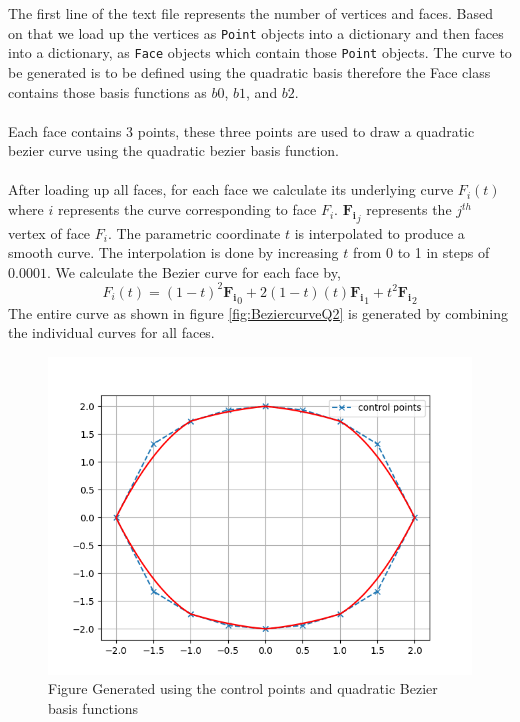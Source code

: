 \documentclass[a4paper, 11pt]{article}
\begin{document}
\begin{enumerate}
The first line of the text file represents the number of vertices and faces. Based on that we load up the vertices as \texttt{Point} objects into a dictionary and then faces into a dictionary, as \texttt{Face} objects which contain those \texttt{Point} objects. The curve to be generated is to be defined using the quadratic basis therefore the Face class contains those basis functions as $b0$, $b1$, and $b2$. 
\\ \\
Each face contains 3 points, these three points are used to draw a quadratic bezier curve using the quadratic bezier basis function. \\ \\
After loading up all faces, for each face we calculate its underlying curve \(F_i(t)\) where \(i\) represents the curve corresponding to face \(F_i\). \(\boldsymbol{F_i}_j\) represents the $j^{th}$ vertex of face \(F_i\). The parametric coordinate $t$ is interpolated to produce a smooth curve. The interpolation is done by increasing $t$ from 0 to 1 in steps of $0.0001$. We calculate the Bezier curve for each face by, 
\begin{equation}
\label{eq:face}
    F_i(t) = (1-t)^2 \boldsymbol{F_i}_0 + 2(1-t)(t)\boldsymbol{F_i}_1 + t^2\boldsymbol{F_i}_2 %
\end{equation}
The entire curve as shown in figure \ref{fig:BeziercurveQ2} is generated by combining the individual curves for all faces. 
\begin{figure}[ht]
\includegraphics[scale=0.8]{resources/Q2_QBezBasis.png}  
\centering
\caption{Figure Generated using the control points and quadratic Bezier basis functions}

\end{figure}
\end{enumerate}
\end{document}
